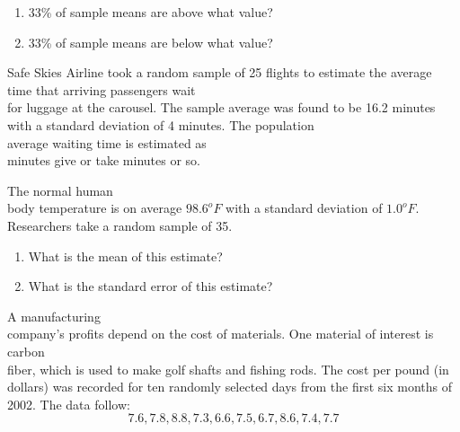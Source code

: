 \documentclass[11pt]{book}\usepackage[]{graphicx}\usepackage[]{color}
\begin{document}
\begin{exercises}
\begin{solution}
\begin{enumerate}
  

  \item 33\% of sample means are above what value? 
  \item 33\% of sample means are below what value?
\end{enumerate}
\end{solution}

\begin{exercise}  %

Safe Skies Airline took a random sample of 25 flights to estimate the average time that arriving passengers wait \\ for luggage at the carousel.  The sample average was found to be 16.2 minutes with a standard deviation of 4 minutes.  The population \\ average waiting time is estimated as \\ \underline{\phantom{xxxxxxxx}} minutes give or take  \underline{\phantom{xxxxxxxx}} minutes or  so.

\end{exercise}
\begin{solution}  %

\end{solution}

\begin{exercise}  %

The normal human \\ body temperature is on average $98.6^o F$ with a standard deviation of $1.0^o F$. Researchers take a random sample of 35. 

\begin{enumerate}
\item What is the mean of this estimate? 
\item What is the standard error of this estimate?
\end{enumerate}

\end{exercise}
\begin{solution}  %

\end{solution}

\begin{exercise}  %

A manufacturing \\ company's profits depend on the cost of materials.  One material of interest is carbon \\ fiber, which is used to make golf shafts and fishing rods.  The cost per pound (in dollars) was recorded for ten randomly selected days from the first six months of 2002. The data follow:
            $$7.6, 7.8, 8.8, 7.3, 6.6, 7.5, 6.7, 8.6, 7.4, 7.7$$
            

\end{exercise}
\end{exercises}
\end{document}
